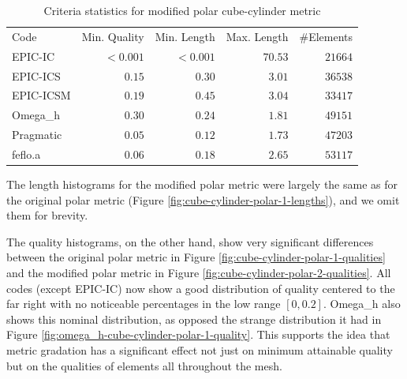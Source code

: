 \documentclass[3p,times,procedia,number]{elsarticle}
\begin{document}
\begin{table}
\caption{Criteria statistics for modified polar cube-cylinder metric}
\label{tab:polar-2-stats}
\begin{tabular}{lrrrr}
Code & Min. Quality & Min. Length & Max. Length & \#Elements\\
EPIC-IC    &$<0.001$&     $<0.001$&      $70.53$&    $21664$\\
EPIC-ICS   &$  0.15$&     $  0.30$&      $ 3.01$&    $36538$\\
EPIC-ICSM  &$  0.19$&     $  0.45$&      $ 3.04$&    $33417$\\
Omega\_h   &$  0.30$&     $  0.24$&      $ 1.81$&    $49151$\\
Pragmatic  &$  0.05$&     $  0.12$&      $ 1.73$&    $47203$\\
feflo.a    &$  0.06$&     $  0.18$&      $ 2.65$&    $53117$\\
\end{tabular}
\end{table}

The length histograms for the modified polar metric were largely the
same as for the original polar metric
(Figure \ref{fig:cube-cylinder-polar-1-lengths}),
and we omit them for brevity.

The quality histograms, on the other hand, show very significant differences
between the original polar metric in Figure \ref{fig:cube-cylinder-polar-1-qualities}
and the modified polar metric in Figure \ref{fig:cube-cylinder-polar-2-qualities}.
All codes (except EPIC-IC) now show a good distribution of quality centered to the
far right with no noticeable percentages in the low range $[0,0.2]$.
Omega\_h also shows this nominal distribution, as opposed the strange distribution
it had in Figure \ref{fig:omega_h-cube-cylinder-polar-1-quality}.
This supports the idea that metric gradation has a significant effect not just
on minimum attainable quality but on the qualities of elements all throughout the mesh.
\end{document}
